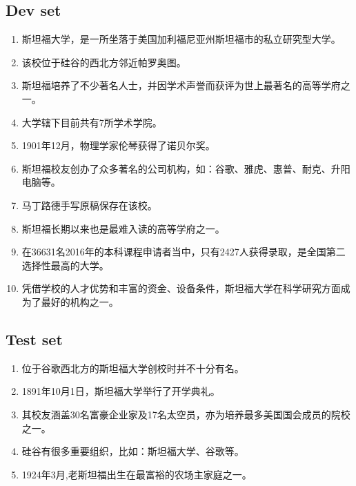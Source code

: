 \documentclass[11pt]{article} %
\begin{document}
\begin{CJK}{UTF8}{gbsn}
\subsection{Dev set}
\begin{enumerate}
\item 斯坦福大学，是一所坐落于美国加利福尼亚州斯坦福市的私立研究型大学。
\item 该校位于硅谷的西北方邻近帕罗奥图。
\item 斯坦福培养了不少著名人士，并因学术声誉而获评为世上最著名的高等学府之一。
\item 大学辖下目前共有7所学术学院。
\item 1901年12月，物理学家伦琴获得了诺贝尔奖。
\item 斯坦福校友创办了众多著名的公司机构，如：谷歌、雅虎、惠普、耐克、升阳电脑等。
\item 马丁路德手写原稿保存在该校。
\item 斯坦福长期以来也是最难入读的高等学府之一。
\item 在36631名2016年的本科课程申请者当中，只有2427人获得录取，是全国第二选择性最高的大学。
\item 凭借学校的人才优势和丰富的资金、设备条件，斯坦福大学在科学研究方面成为了最好的机构之一。
\end{enumerate}
\subsection{Test set}
\begin{enumerate}
\item 位于谷歌西北方的斯坦福大学创校时并不十分有名。
\item 1891年10月1日，斯坦福大学举行了开学典礼。
\item 其校友涵盖30名富豪企业家及17名太空员，亦为培养最多美国国会成员的院校之一。
\item 硅谷有很多重要组织，比如：斯坦福大学、谷歌等。
\item 1924年3月,老斯坦福出生在最富裕的农场主家庭之一。
\end{enumerate}


\end{CJK}
\end{document}
